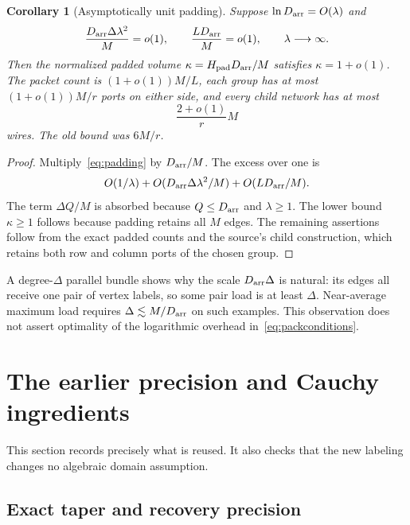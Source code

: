 \documentclass[11pt,letterpaper]{article}
\numberwithin{equation}{section}
\newtheorem{corollary}[theorem]{Corollary}
\theoremstyle{definition}\newtheorem{definition}[theorem]{Definition}
\theoremstyle{remark}\newtheorem{remark}[theorem]{Remark}
\begin{document}
\begin{corollary}[Asymptotically unit padding]\label{cor:unitpadding}
Suppose $\ln D_{\rm arr}=O(\lambda)$ and
\begin{equation}\label{eq:packconditions}
 \frac{D_{\rm arr}\Delta\lambda^2}{M}=o(1),\qquad
 \frac{LD_{\rm arr}}M=o(1),\qquad \lambda\longrightarrow\infty.
\end{equation}
Then the normalized padded volume $\kappa=H_{\rm pad}D_{\rm arr}/M$ satisfies $\kappa=1+o(1)$. The packet count is $(1+o(1))M/L$, each group has at most $(1+o(1))M/r$ ports on either side, and every child network has at most
\begin{equation}\label{eq:child}
 \frac{2+o(1)}r M
\end{equation}
wires. The old bound was $6M/r$.
\end{corollary}

\begin{proof}
Multiply~\eqref{eq:padding} by $D_{\rm arr}/M$. The excess over one is
\[
 O(1/\lambda)+O(D_{\rm arr}\Delta\lambda^2/M)+O(LD_{\rm arr}/M).
\]
The term $\Delta Q/M$ is absorbed because $Q\le D_{\rm arr}$ and $\lambda\ge1$. The lower bound $\kappa\ge1$ follows because padding retains all $M$ edges. The remaining assertions follow from the exact padded counts and the source's child construction, which retains both row and column ports of the chosen group.
\end{proof}

A degree-$\Delta$ parallel bundle shows why the scale $D_{\rm arr}\Delta$ is natural: its edges all receive one pair of vertex labels, so some pair load is at least $\Delta$. Near-average maximum load requires $\Delta\lesssim M/D_{\rm arr}$ on such examples. This observation does not assert optimality of the logarithmic overhead in~\eqref{eq:packconditions}.

\section{The earlier precision and Cauchy ingredients}
\label{sec:ingredients}

This section records precisely what is reused. It also checks that the new labeling changes no algebraic domain assumption.

\subsection{Exact taper and recovery precision}
\end{document}
